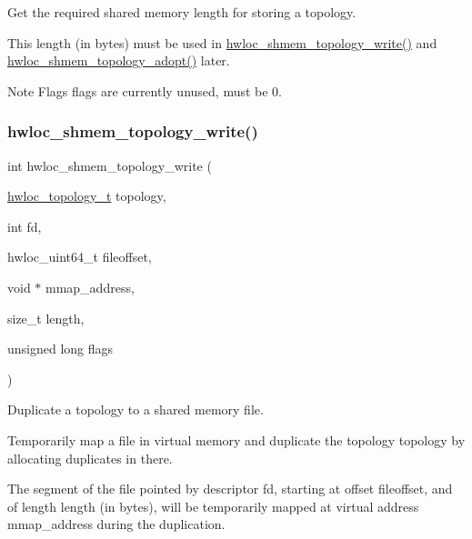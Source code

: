 Get the required shared memory length for storing a topology. 

This length (in bytes) must be used in \hyperlink{a00226_ga61b20e346fc76f76420e3a88cc80a671}{hwloc\+\_\+shmem\+\_\+topology\+\_\+write()} and \hyperlink{a00226_ga21545bd0f09d9b554c8e60a630e0e629}{hwloc\+\_\+shmem\+\_\+topology\+\_\+adopt()} later.

\begin{DoxyNote}{Note}
Flags {\ttfamily flags} are currently unused, must be 0. 
\end{DoxyNote}
\mbox{\label{a00226_ga61b20e346fc76f76420e3a88cc80a671}} 
\subsubsection{\texorpdfstring{hwloc\+\_\+shmem\+\_\+topology\+\_\+write()}{hwloc\_shmem\_topology\_write()}}
{\footnotesize\ttfamily int hwloc\+\_\+shmem\+\_\+topology\+\_\+write (\begin{DoxyParamCaption}\item[{\hyperlink{a00186_ga9d1e76ee15a7dee158b786c30b6a6e38}{hwloc\+\_\+topology\+\_\+t}}]{topology,  }\item[{int}]{fd,  }\item[{hwloc\+\_\+uint64\+\_\+t}]{fileoffset,  }\item[{void $\ast$}]{mmap\+\_\+address,  }\item[{size\+\_\+t}]{length,  }\item[{unsigned long}]{flags }\end{DoxyParamCaption})}



Duplicate a topology to a shared memory file. 

Temporarily map a file in virtual memory and duplicate the topology {\ttfamily topology} by allocating duplicates in there.

The segment of the file pointed by descriptor {\ttfamily fd}, starting at offset {\ttfamily fileoffset}, and of length {\ttfamily length} (in bytes), will be temporarily mapped at virtual address {\ttfamily mmap\+\_\+address} during the duplication.

